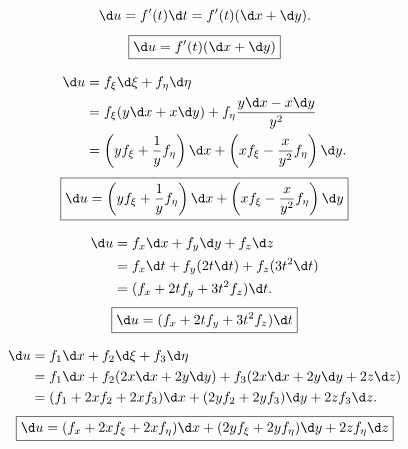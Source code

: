 \begin{solution}

    \begin{equation}
        \d u = f'(t) \d t = f'(t) (\d x + \d y).
    \end{equation}
    \begin{equation}
        \boxed{\d u = f'(t) (\d x + \d y)}
    \end{equation}


    \begin{equation}
        \begin{aligned}
            \d u & = f_{\xi} \d \xi + f_{\eta} \d \eta                                                                              \\
                 & = f_{\xi} (y \d x + x \d y) + f_{\eta} \frac{y \d x - x \d y}{y^2}                                               \\
                 & = \left( y f_{\xi} + \frac{1}{y} f_{\eta} \right) \d x + \left( x f_{\xi} - \frac{x}{y^2} f_{\eta} \right) \d y.
        \end{aligned}
    \end{equation}
    \begin{equation}
        \boxed{\d u = \left( y f_{\xi} + \frac{1}{y} f_{\eta} \right) \d x + \left( x f_{\xi} - \frac{x}{y^2} f_{\eta} \right) \d y}
    \end{equation}


    \begin{equation}
        \begin{aligned}
            \d u & = f_x \d x + f_y \d y + f_z \d z             \\
                 & = f_x \d t + f_y (2t \d t) + f_z (3t^2 \d t) \\
                 & = (f_x + 2t f_y + 3t^2 f_z) \d t.
        \end{aligned}
    \end{equation}
    \begin{equation}
        \boxed{\d u = (f_x + 2t f_y + 3t^2 f_z) \d t}
    \end{equation}


    \begin{equation}
        \begin{aligned}
            \d u & = f_1 \d x + f_2 \d \xi + f_3 \d \eta                                    \\
                 & = f_1 \d x + f_2 (2x \d x + 2y \d y) + f_3 (2x \d x + 2y \d y + 2z \d z) \\
                 & = (f_1 + 2x f_2 + 2x f_3) \d x + (2y f_2 + 2y f_3) \d y + 2z f_3 \d z.
        \end{aligned}
    \end{equation}
    \begin{equation}
        \boxed{\d u = (f_x + 2x f_{\xi} + 2x f_{\eta}) \d x + (2y f_{\xi} + 2y f_{\eta}) \d y + 2z f_{\eta} \d z}
    \end{equation}


\end{solution}
